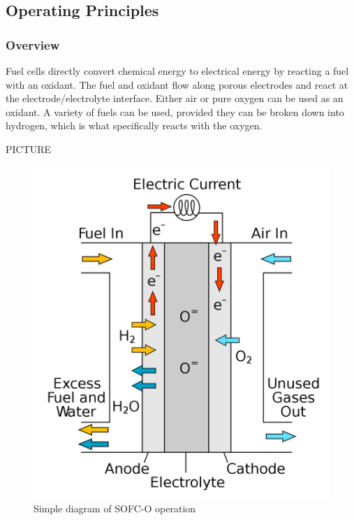\subsection{Operating Principles}
    \subsubsection{Overview}
    Fuel cells directly convert chemical energy to electrical energy by reacting a fuel with an oxidant. The fuel and oxidant flow along porous electrodes and react at the electrode/electrolyte interface. Either air or pure oxygen can be used as an oxidant. A variety of fuels can be used, provided they can be broken down into hydrogen, which is what specifically reacts with the oxygen.
    
    
       PICTURE
    
    \begin{figure}[htb]
        \centering
        \includegraphics[scale=0.2]{1200px-Solid_oxide_fuel_cell.png}
        \caption{Simple diagram of SOFC-O operation \cite{lewisref1}}
        \label{fig:SOFCbasic}
    \end{figure}
    
